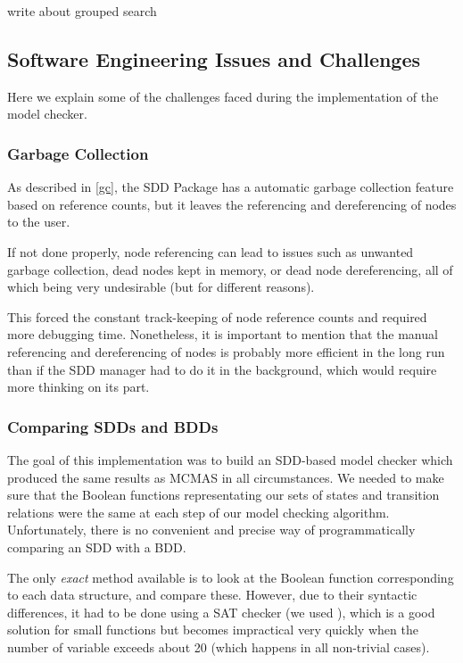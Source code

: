 \documentclass[11pt]{article}
\begin{document}
write about grouped search

\subsection{Software Engineering Issues and Challenges}

Here we explain some of the challenges faced during the implementation of the model checker. 

\subsubsection{Garbage Collection}

As described in \ref{gc}, the SDD Package has a automatic garbage collection feature based on reference counts, but it leaves the referencing and dereferencing of nodes to the user. 

If not done properly, node referencing can lead to issues such as unwanted garbage collection, dead nodes kept in memory, or dead node dereferencing, all of which being very undesirable (but for different reasons).

This forced the constant track-keeping of node reference counts and required more debugging time. Nonetheless, it is important to mention that the manual referencing and dereferencing of nodes is probably more efficient in the long run than if the SDD manager had to do it in the background, which would require more thinking on its part.

\subsubsection{Comparing SDDs and BDDs}

The goal of this implementation was to build an SDD-based model checker which produced the same results as MCMAS in all circumstances. We needed to make sure that the Boolean functions representating our sets of states and transition relations were the same at each step of our model checking algorithm. Unfortunately, there is no convenient and precise way of programmatically comparing an SDD with a BDD. 

The only \textit{exact} method available is to look at the Boolean function corresponding to each data structure, and compare these. However, due to their syntactic differences, it had to be done using a SAT checker (we used \cite{minisat}), which is a good solution for small functions but becomes impractical very quickly when the number of variable exceeds about 20 (which happens in all non-trivial cases).  
\end{document}
